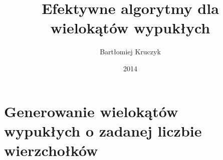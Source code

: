 \documentclass[oneside,brudnopis]{xelatex-mgr/xmgr}
\author{Bartłomiej Kruczyk}
\title{Efektywne algorytmy dla wielokątów wypukłych}
\date{2014}
\theoremstyle{definition}
\begin{document}









\summary

\appendix
\chapter{Generowanie wielokątów wypukłych o zadanej liczbie
wierzchołków}




\listoftables
\listoffigures

\oswiadczenie
\end{document}
